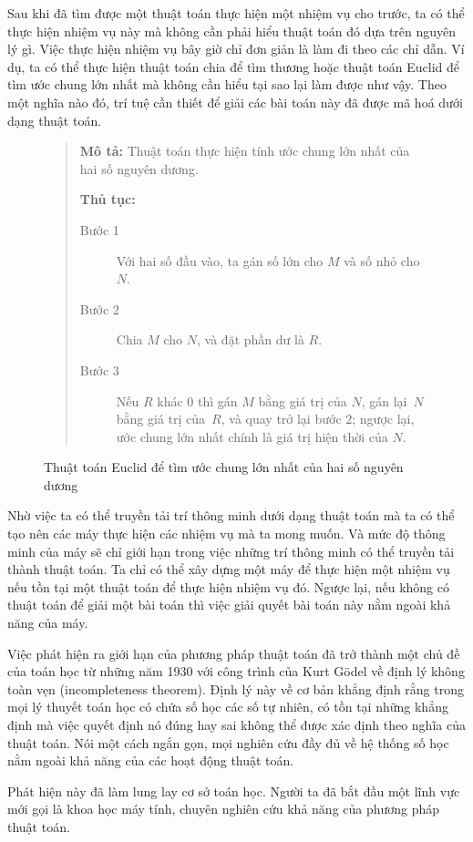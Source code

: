 Sau khi đã tìm được một thuật toán thực hiện một nhiệm vụ cho trước, ta có thể thực hiện
nhiệm vụ này mà không cần phải hiểu thuật toán đó dựa trên nguyên lý gì. Việc thực hiện
nhiệm vụ bây giờ chỉ đơn giản là làm đi theo các chỉ dẫn. Ví dụ, ta có thể
thực hiện thuật toán chia để tìm thương hoặc thuật toán Euclid để tìm ước chung lớn nhất mà
không cần hiểu tại sao lại làm được như vậy.  Theo một nghĩa nào đó, trí tuệ cần thiết để
giải các bài toán này đã được mã hoá dưới dạng thuật toán.



\begin{figure}[tb]
  \begin{quotation}
    \noindent
    \textbf{Mô tả:} Thuật toán thực hiện tính ước chung lớn nhất của hai số
    nguyên dương.

    \vspace{0.5cm}
    \noindent
    \textbf{Thủ tục:}
    \begin{description}
    \item[Bước 1] Với hai số đầu vào, ta gán số lớn cho $M$ và số nhỏ cho $N$.

    \item[Bước 2] Chia $M$ cho $N$, và đặt phần dư là $R$.

    \item[Bước 3] Nếu $R$ khác $0$ thì gán $M$ bằng giá trị của $N$, gán lại~$N$
      bằng giá trị của~$R$, và quay trở lại bước $2$; ngược lại, ước chung lớn
      nhất chính là giá trị hiện thời của  $N$.
    \end{description}
  \end{quotation}
  \caption{Thuật toán Euclid để tìm ước chung lớn nhất của hai số nguyên dương}
  \label{fig:fig0.2}
\end{figure}


Nhờ việc ta có thể truyền tải trí thông minh dưới dạng thuật toán mà ta có thể tạo nên các
máy thực hiện các nhiệm vụ mà ta mong muốn. Và mức độ thông minh của máy
sẽ chỉ giới hạn trong việc những trí thông minh có thể truyền tải thành thuật toán. Ta chỉ
có thể xây dựng một máy để thực hiện một nhiệm vụ nếu tồn tại một thuật toán để thực hiện
nhiệm vụ đó. Ngược lại, nếu không có thuật toán để giải một bài toán thì việc giải quyết
bài toán này nằm ngoài khả năng của máy.


Việc phát hiện ra giới hạn của phương pháp thuật toán đã trở thành một chủ đề của toán học
từ những năm 1930 với công trình của Kurt G\"odel về định lý không toàn vẹn
(incompleteness theorem). Định lý này về cơ bản khẳng định rằng trong mọi lý thuyết toán
học có chứa số học các số tự nhiên, có tồn tại những khẳng định mà việc quyết định nó đúng
hay sai không thể được xác định theo nghĩa của thuật toán. Nói một cách ngắn gọn, mọi nghiên cứu
đầy đủ  về hệ thống số học nằm ngoài khả năng của các hoạt động thuật toán.

Phát hiện này đã làm lung lay cơ sở toán học. Người ta đã bắt đầu một lĩnh vực mới gọi là
khoa học máy tính, chuyên nghiên cứu khả năng của phương pháp thuật toán.




